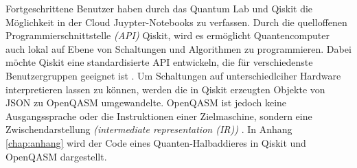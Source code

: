 Fortgeschrittene Benutzer haben durch das Quantum Lab und Qiskit die M\"oglichkeit in der Cloud Juypter-Notebooks zu verfassen. Durch die quelloffenen Programmierschnittstelle \textit{(API)} Qiskit, wird es erm\"oglicht Quantencomputer auch lokal auf Ebene von Schaltungen und Algorithmen zu programmieren. Dabei m\"ochte Qiskit eine standardisierte API entwickeln, die f\"ur verschiedenste Benutzergruppen geeignet ist \cite{Qiskit_backend_2018}. Um Schaltungen auf unterschiedlciher Hardware interpretieren lassen zu k\"onnen, werden die in Qiskit erzeugten Objekte von JSON zu OpenQASM umgewandelte. OpenQASM ist jedoch keine Ausgangssprache oder die Instruktionen einer Zielmaschine, sondern eine Zwischendarstellung \textit{(intermediate representation (IR))} \cite{Openqasm_2017}. In Anhang \ref{chap:anhang} wird der Code eines Quanten-Halbaddieres in Qiskit und OpenQASM dargestellt.

